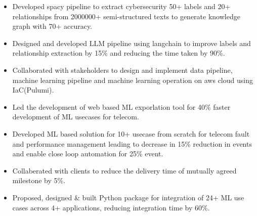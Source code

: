 \documentclass[10pt,a4paper,ragged2e,withhyper]{altacv}
\author{Madhusudan Kumar}
\date{\today}
\title{}
\begin{document}

\makecvheader

\label{sec:org4fc6649}

\label{sec:org4c903a9}

\begin{itemize}
\item Developed spacy pipeline to extract cybersecurity 50+ labels and 20+ relationships from 2000000+ semi-structured texts to generate knowledge graph with 70+ accuracy.
\item Designed and developed LLM pipeline using langchain to improve labels and relationship extraction by 15\% and reducing the time taken by 90\%.
\item Collaborated with stakeholders to design and implement data pipeline, machine learning pipeline and machine learning operation on aws cloud using IaC(Pulumi).
\end{itemize}

\begin{itemize}
\item Led the development of web based ML exporlation tool for 40\% faster development of ML usecases for telecom.
\item Developed ML based solution for 10+ usecase from scratch for telecom fault and performance management leading to decrease in 15\% reduction in events and enable close loop automation for 25\% event.
\item Collaberated with clients to reduce the delivery time of mutually agreed milestone by 5\%.
\end{itemize}

\begin{itemize}
\item Proposed, designed \& built Python package for integration of 24+ ML use cases across 4+ applications, reducing integration time by 60\%.
\end{itemize}
\end{document}
